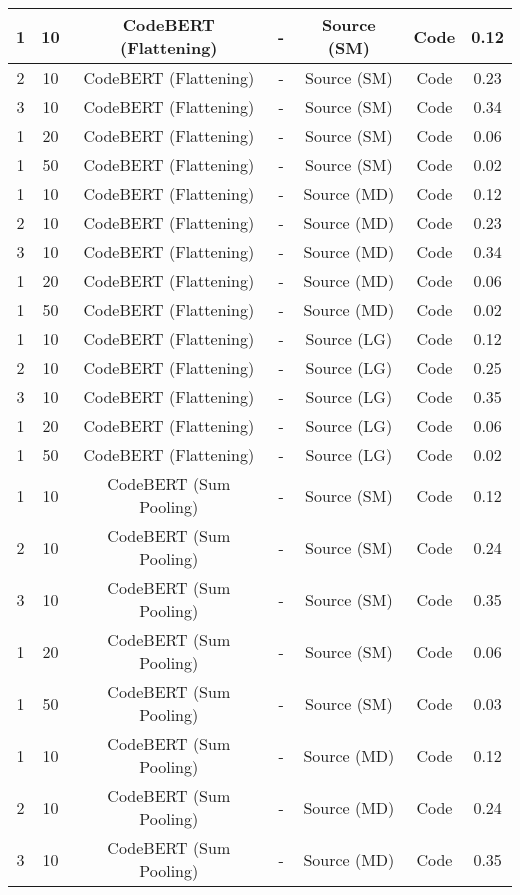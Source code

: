 \begin{longtable}{|c|c|c|c|c|c|c|}
\hline
1 & 10 & CodeBERT (Flattening) & - & Source (SM) & Code & 0.12 \\
\hline
2 & 10 & CodeBERT (Flattening) & - & Source (SM) & Code & 0.23 \\
\hline
3 & 10 & CodeBERT (Flattening) & - & Source (SM) & Code & 0.34 \\
\hline
1 & 20 & CodeBERT (Flattening) & - & Source (SM) & Code & 0.06 \\
\hline
1 & 50 & CodeBERT (Flattening) & - & Source (SM) & Code & 0.02 \\
\hline
1 & 10 & CodeBERT (Flattening) & - & Source (MD) & Code & 0.12 \\
\hline
2 & 10 & CodeBERT (Flattening) & - & Source (MD) & Code & 0.23 \\
\hline
3 & 10 & CodeBERT (Flattening) & - & Source (MD) & Code & 0.34 \\
\hline
1 & 20 & CodeBERT (Flattening) & - & Source (MD) & Code & 0.06 \\
\hline
1 & 50 & CodeBERT (Flattening) & - & Source (MD) & Code & 0.02 \\
\hline
1 & 10 & CodeBERT (Flattening) & - & Source (LG) & Code & 0.12 \\
\hline
2 & 10 & CodeBERT (Flattening) & - & Source (LG) & Code & 0.25 \\
\hline
3 & 10 & CodeBERT (Flattening) & - & Source (LG) & Code & 0.35 \\
\hline
1 & 20 & CodeBERT (Flattening) & - & Source (LG) & Code & 0.06 \\
\hline
1 & 50 & CodeBERT (Flattening) & - & Source (LG) & Code & 0.02 \\
\hline
1 & 10 & CodeBERT (Sum Pooling) & - & Source (SM) & Code & 0.12 \\
\hline
2 & 10 & CodeBERT (Sum Pooling) & - & Source (SM) & Code & 0.24 \\
\hline
3 & 10 & CodeBERT (Sum Pooling) & - & Source (SM) & Code & 0.35 \\
\hline
1 & 20 & CodeBERT (Sum Pooling) & - & Source (SM) & Code & 0.06 \\
\hline
1 & 50 & CodeBERT (Sum Pooling) & - & Source (SM) & Code & 0.03 \\
\hline
1 & 10 & CodeBERT (Sum Pooling) & - & Source (MD) & Code & 0.12 \\
\hline
2 & 10 & CodeBERT (Sum Pooling) & - & Source (MD) & Code & 0.24 \\
\hline
3 & 10 & CodeBERT (Sum Pooling) & - & Source (MD) & Code & 0.35 \\

\end{longtable}
